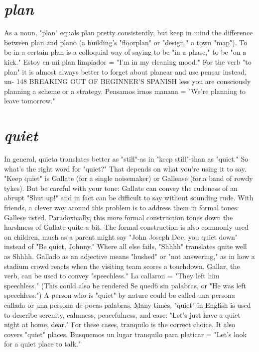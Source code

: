 \section{\emph{plan}}

As a noun, "plan" equals plan pretty consistently, but keep in
mind the difference between plan and plano (a building's "floorplan"
or "design," a town "map"). To be in a certain plan is a colloquial way
of saying to be "in a phase," to be "on a kick." Estoy en mi plan limpiador = "I'm in my cleaning mood." For the verb "to plan" it is almost always better to forget about planear and use pensar instead, un-
148 BREAKING OUT OF BEGINNER'S SPANISH
less you are consciously planning a scheme or a strategy. Pensamos
irnos manana = "We're planning to leave tomorrow."

\section{\emph{quiet}}

In general, quieta translates better as "still"-as in "keep
still"-than as "quiet." So what's the right word for "quiet?" That
depends on what you're using it to say. "Keep quiet" is Gallate (for
a single noisemaker) or Gallense (for.a band of rowdy tykes). But be
careful with your tone: Gallate can convey the rudeness of an abrupt
"Shut up!" and in fact can be difficult to say without sounding rude.
With friends, a clever way around this problem is to address them in
formal tones: Gallese usted. Paradoxically, this more formal construction tones down the harshness of Gallate quite a bit. The formal construction is also commonly used on children, much as a parent might
say "John Joseph Doe, you quiet down" instead of "Be quiet, Johnny."
Where all else fails, "Shhhh" translates quite well as Shhhh.
Gallado as an adjective means "hushed" or "not answering,"
as in how a stadium crowd reacts when the visiting team scores a
touchdown. Gallar, the verb, can be used to convey "speechless." La
callaron = "They left him speechless." (This could also be rendered
Se qued6 sin palabras, or "He was left speechless.") A person who is
"quiet" by nature could be called una persona callada or una persona
de pocas palabras.
Many times, "quiet" in English is used to describe serenity,
calmness, peacefulness, and ease: "Let's just have a quiet night at
home, dear." For these cases, tranquilo is the correct choice. It also
covers "quiet" places. Busquemos un lugar tranquilo para platicar =
"Let's look for a quiet place to talk."

